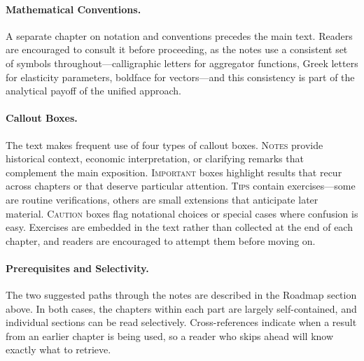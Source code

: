 \paragraph{Mathematical Conventions.}
A separate chapter on notation and conventions precedes the main text.
Readers are encouraged to consult it before proceeding, as the notes use a consistent set of symbols throughout---calligraphic letters for aggregator functions, Greek letters for elasticity parameters, boldface for vectors---and this consistency is part of the analytical payoff of the unified approach.

\paragraph{Callout Boxes.}
The text makes frequent use of four types of callout boxes.
\textsc{Notes} provide historical context, economic interpretation, or clarifying remarks that complement the main exposition.
\textsc{Important} boxes highlight results that recur across chapters or that deserve particular attention.
\textsc{Tips} contain exercises---some are routine verifications, others are small extensions that anticipate later material.
\textsc{Caution} boxes flag notational choices or special cases where confusion is easy.
Exercises are embedded in the text rather than collected at the end of each chapter, and readers are encouraged to attempt them before moving on.

\paragraph{Prerequisites and Selectivity.}
The two suggested paths through the notes are described in the Roadmap section above.
In both cases, the chapters within each part are largely self-contained, and individual sections can be read selectively.
Cross-references indicate when a result from an earlier chapter is being used, so a reader who skips ahead will know exactly what to retrieve.